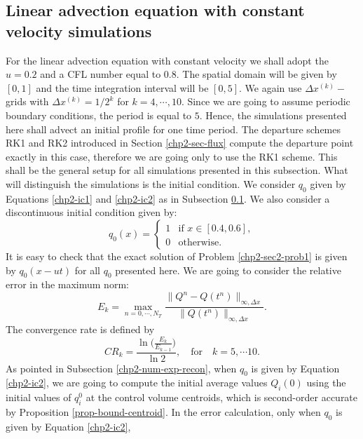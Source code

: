 \subsection{Linear advection equation with constant velocity simulations}
\label{chp2-sec-numerical-exp-1}
For the linear advection equation with constant velocity we shall adopt the $u=0.2$ and 
a CFL number equal to $0.8$.
The spatial domain will be given by $[0,1]$ and the time integration interval will be $[0,5]$. We again use $\Delta x^{(k)}-$grids with $\Delta x^{(k)} = 1/2^k$ for $k=4,
 \cdots, 10$.
Since we are going to assume periodic boundary conditions, the period is equal to $5$. 
Hence, the simulations presented here shall advect an initial profile for one time period. 
The departure schemes RK1 and RK2 introduced in Section \ref{chp2-sec-flux} compute
the departure point exactly in this case, therefore we are going only to use the RK1 scheme.
This shall be the general setup for all simulations presented in this subsection. 
What will distinguish the simulations is the initial condition.
We consider $q_0$ given by Equations \eqref{chp2-ic1} and \eqref{chp2-ic2} as
in Subsection \ref{chp2-sec-numerical-exp-1}.
We also consider a discontinuous initial condition given by:
\begin{equation}
	\label{chp2-ic3}
		q_0(x) =  
  \begin{cases}
		1 & \text{if } x \in [0.4,0.6],\\
		0 & \text{otherwise}.
  \end{cases}
\end{equation}
It is easy to check that the  exact solution of Problem \ref{chp2-sec2-prob1}
is given by $q_0(x-ut)$ for all $q_0$ presented here. We are going to consider the relative
error in the maximum norm:
\begin{equation*}
	E_k = \max_{n=0,\cdots, N_T}
	\frac{\| Q^n - Q(t^n) \|_{\infty, \Delta x}}{\|Q(t^n)\|_{\infty, \Delta x}}.
\end{equation*}
The convergence rate is defined by
\begin{equation*}
	CR_k = \frac{\ln{\bigg(\frac{E_{k}}{E_{k-1}}}\bigg)}{\ln 2}, \quad \text{for} \quad k = 5, \cdots 10.
\end{equation*}
As pointed in Subsection \ref{chp2-num-exp-recon}, when $q_0$ is given by Equation \eqref{chp2-ic2},
we are going to compute the initial average values $Q_i(0)$ using
the initial values of $q^0_i$ at the control volume centroids, which is second-order 
accurate by Proposition \ref{prop-bound-centroid}. 
In the error calculation, only when $q_0$ is given by Equation \eqref{chp2-ic2},
